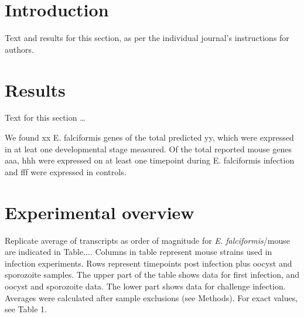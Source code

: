 \documentclass{bmcart}
\begin{document}



\section*{Introduction}
Text and results for this section, as per the individual journal's instructions for authors. 


  \section*{Results}
Text for this section \ldots

We found xx E. falciformis genes of the total predicted yy, which were expressed in at leat one developmental stage measured.
Of the total reported mouse genes aaa, hhh were expressed on at least one timepoint during E. falciformis infection and fff were expressed in controls.  

\section{Experimental overview}
Replicate average of transcripts as order of magnitude for \textit{E. falciformis}/mouse are indicated in Table.... Columns in table represent mouse strains used in infection experiments. Rows represent timepoints post infection plus oocyst and sporozoite samples. The upper part of the table shows data for first infection, and oocyst and sporozoite data. The lower part shows data for challenge infection. Averages were calculated after sample exclusions (see Methods). For exact values, see Table 1.
\end{document}
